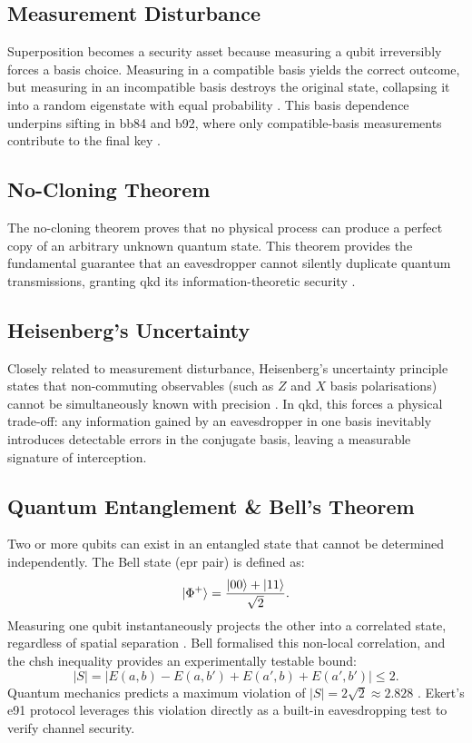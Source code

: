 \documentclass[11pt, a4paper]{report}
\begin{document}
\subsection{Measurement Disturbance}
Superposition becomes a security asset because measuring a \gls{qubit} irreversibly forces a basis choice. Measuring in a compatible basis yields the correct outcome, but measuring in an incompatible basis destroys the original state, collapsing it into a random eigenstate with equal probability \cite{QKDbible}. This basis dependence underpins \gls{sifting} in \gls{bb84} and \gls{b92}, where only compatible-basis measurements contribute to the final key \cite{BB84, B92}.

\subsection{No-Cloning Theorem}
The no-cloning theorem \cite{WZ1982, Dieks1982} proves that no physical process can produce a perfect copy of an arbitrary unknown quantum state. This theorem provides the fundamental guarantee that an eavesdropper cannot silently duplicate quantum transmissions, granting \gls{qkd} its information-theoretic security \cite{ekertQI}.

\subsection{Heisenberg's Uncertainty}
Closely related to measurement disturbance, Heisenberg's uncertainty principle \cite{Heisenberg1927} states that non-commuting observables (such as $Z$ and $X$ basis polarisations) cannot be simultaneously known with precision \cite{QKDbible}. In \gls{qkd}, this forces a physical trade-off: any information gained by an eavesdropper in one basis inevitably introduces detectable errors in the conjugate basis, leaving a measurable signature of interception.

\subsection{Quantum Entanglement \& Bell's Theorem}
Two or more \glspl{qubit} can exist in an entangled state that cannot be determined independently. The Bell state (\gls{epr} pair) \cite{EPR1935} is defined as:
%
\begin{equation}
\label{eq:bell-state}
\ket{\Phi^{+}} = \frac{\ket{00}+\ket{11}}{\sqrt{2}}.
\end{equation}
%
Measuring one \gls{qubit} instantaneously projects the other into a correlated state, regardless of spatial separation \cite{QKDbible}. Bell \cite{Bell1964} formalised this non-local correlation, and the \gls{chsh} inequality \cite{CHSH1969} provides an experimentally testable bound:
%
\begin{equation}
\label{eq:chsh}
|S| = |E(a,b) - E(a,b') + E(a',b) + E(a',b')| \leq 2.
\end{equation}
%
Quantum mechanics predicts a maximum violation of $|S| = 2\sqrt{2} \approx 2.828$ \cite{Aspect1982}. Ekert's \gls{e91} protocol \cite{E91} leverages this violation directly as a built-in eavesdropping test to verify channel security.
\end{document}
